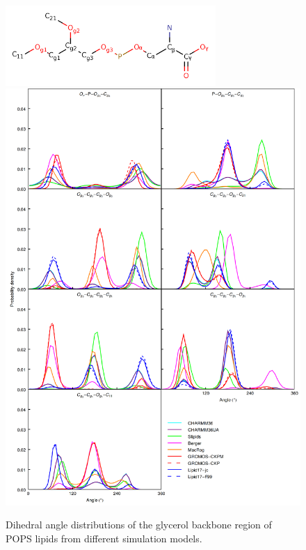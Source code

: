 \documentclass[journal=jpcbfk]{achemso}
\begin{document}
\begin{figure}[]
  \centering
    \includegraphics[width=8.0cm]{../Figs/PS_Labels.png}
  \includegraphics[width=13.0cm]{../Figs/figS6.png}
  \caption{\label{dihedralsGLY}
    Dihedral angle distributions of the glycerol backbone region of POPS lipids from different simulation models.
  }
\end{figure}
\end{document}
